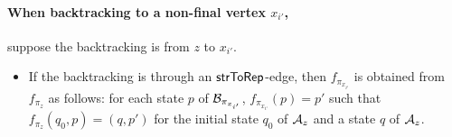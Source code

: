 \documentclass{llncs}
\begin{document}
\paragraph*{When backtracking to a non-final vertex $x_{i'}$,}  suppose the backtracking is from $z$ to $x_{i'}$.
\begin{itemize}
\item If the backtracking is through an $\mathsf{strToRep}$-edge, then $f_{\pi_{x_{i'}}}$ is obtained from $f_{\pi_z}$ as follows: for each state $p$ of $\mathcal{B}_{\pi_{x_{i'}}}$, $f_{\pi_{x_{i'}}}(p) = p'$ such that $f_{\pi_z}(q_0, p)= (q, p')$ for the initial state $q_0$ of $\mathcal{A}_{z}$ and a state $q$ of $\mathcal{A}_z$. 



\end{itemize}
\end{document}
